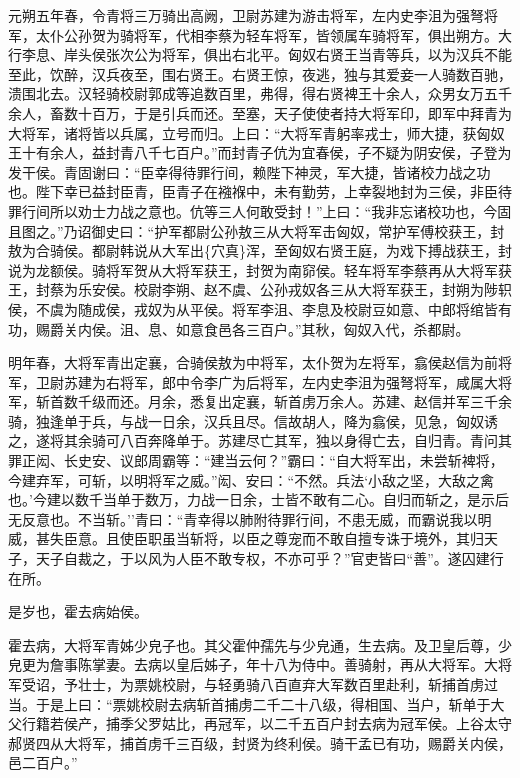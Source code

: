 \documentclass[]{article}
\begin{document}
元朔五年春，令青将三万骑出高阙，卫尉苏建为游击将军，左内史李沮为强弩将军，太仆公孙贺为骑将军，代相李蔡为轻车将军，皆领属车骑将军，俱出朔方。大行李息、岸头侯张次公为将军，俱出右北平。匈奴右贤王当青等兵，以为汉兵不能至此，饮醉，汉兵夜至，围右贤王。右贤王惊，夜逃，独与其爱妾一人骑数百驰，溃围北去。汉轻骑校尉郭成等追数百里，弗得，得右贤裨王十余人，众男女万五千余人，畜数十百万，于是引兵而还。至塞，天子使使者持大将军印，即军中拜青为大将军，诸将皆以兵属，立号而归。上曰：``大将军青躬率戎士，师大捷，获匈奴王十有余人，益封青八千七百户。''而封青子伉为宜春侯，子不疑为阴安侯，子登为发干侯。青固谢曰：``臣幸得待罪行间，赖陛下神灵，军大捷，皆诸校力战之功也。陛下幸已益封臣青，臣青子在襁褓中，未有勤劳，上幸裂地封为三侯，非臣待罪行间所以劝士力战之意也。伉等三人何敢受封！''上曰：``我非忘诸校功也，今固且图之。''乃诏御史曰：``护军都尉公孙敖三从大将军击匈奴，常护军傅校获王，封敖为合骑侯。都尉韩说从大军出\{穴真\}浑，至匈奴右贤王庭，为戏下搏战获王，封说为龙额侯。骑将军贺从大将军获王，封贺为南窌侯。轻车将军李蔡再从大将军获王，封蔡为乐安侯。校尉李朔、赵不虞、公孙戎奴各三从大将军获王，封朔为陟轵侯，不虞为随成侯，戎奴为从平侯。将军李沮、李息及校尉豆如意、中郎将绾皆有功，赐爵关内侯。沮、息、如意食邑各三百户。''其秋，匈奴入代，杀都尉。

明年春，大将军青出定襄，合骑侯敖为中将军，太仆贺为左将军，翕侯赵信为前将军，卫尉苏建为右将军，郎中令李广为后将军，左内史李沮为强弩将军，咸属大将军，斩首数千级而还。月余，悉复出定襄，斩首虏万余人。苏建、赵信并军三千余骑，独逢单于兵，与战一日余，汉兵且尽。信故胡人，降为翕侯，见急，匈奴诱之，遂将其余骑可八百奔降单于。苏建尽亡其军，独以身得亡去，自归青。青问其罪正闳、长史安、议郎周霸等：``建当云何？''霸曰：``自大将军出，未尝斩裨将，今建弃军，可斩，以明将军之威。''闳、安曰：``不然。兵法`小敌之坚，大敌之禽也。'今建以数千当单于数万，力战一日余，士皆不敢有二心。自归而斩之，是示后无反意也。不当斩。''青曰：``青幸得以肺附待罪行间，不患无威，而霸说我以明威，甚失臣意。且使臣职虽当斩将，以臣之尊宠而不敢自擅专诛于境外，其归天子，天子自裁之，于以风为人臣不敢专权，不亦可乎？''官吏皆曰``善''。遂囚建行在所。

是岁也，霍去病始侯。

霍去病，大将军青姊少皃子也。其父霍仲孺先与少皃通，生去病。及卫皇后尊，少皃更为詹事陈掌妻。去病以皇后姊子，年十八为侍中。善骑射，再从大将军。大将军受诏，予壮士，为票姚校尉，与轻勇骑八百直弃大军数百里赴利，斩捕首虏过当。于是上曰：``票姚校尉去病斩首捕虏二千二十八级，得相国、当户，斩单于大父行籍若侯产，捕季父罗姑比，再冠军，以二千五百户封去病为冠军侯。上谷太守郝贤四从大将军，捕首虏千三百级，封贤为终利侯。骑干孟已有功，赐爵关内侯，邑二百户。''
\end{document}
